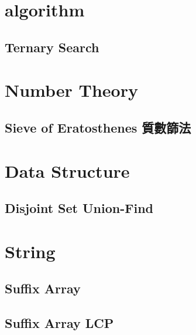 \section{algorithm}
    \subsection{Ternary Search}
        
\section{Number Theory}
    \subsection{Sieve of Eratosthenes 質數篩法}
        

\section{Data Structure}
    \subsection{Disjoint Set Union-Find}
        

\section{String}
    \subsection{Suffix Array}
        
    \subsection{Suffix Array LCP}
        

    
